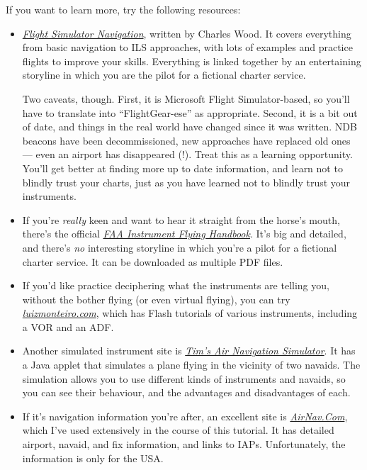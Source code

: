 If you want to learn more, try the following resources:

\begin{itemize}
\item \href{http://www.navfltsm.addr.com}{\textit{Flight Simulator
    Navigation}}, written by Charles Wood.  It covers everything from
  basic navigation to ILS approaches, with lots of examples and
  practice flights to improve your skills.  Everything is linked
  together by an entertaining storyline in which you are the pilot for
  a fictional charter service.

  Two caveats, though.  First, it is Microsoft Flight Simulator-based,
  so you'll have to translate into ``FlightGear-ese'' as appropriate.
  Second, it is a bit out of date, and things in the real world have
  changed since it was written.  NDB beacons have been decommissioned,
  new approaches have replaced old ones --- even an airport has
  disappeared (!).  Treat this as a learning opportunity.  You'll get
  better at finding more up to date information, and learn not to
  blindly trust your charts, just as you have learned not to blindly
  trust your instruments.

\item If you're \emph{really} keen and want to hear it straight from
  the horse's mouth, there's the official
  \href{http://www.faa.gov/library/manuals/aviation/instrument_flying_handbook}{\textit{FAA
      Instrument Flying Handbook}}.  It's big and detailed, and
  there's \emph{no} interesting storyline in which you're a pilot for
  a fictional charter service.  It can be downloaded as multiple PDF
  files.

\item If you'd like practice deciphering what the instruments are
  telling you, without the bother flying (or even virtual flying), you
  can try
  \href{http://www.luizmonteiro.com/Learning.aspx}{\textit{luizmonteiro.com}},
  which has Flash tutorials of various instruments, including a VOR
  and an ADF.

\item Another simulated instrument site is
  \href{http://www.visi.com/~mim/nav/}{\textit{Tim's Air Navigation
      Simulator}}.  It has a Java applet that simulates a plane flying
  in the vicinity of two navaids.  The simulation allows you to use
  different kinds of instruments and navaids, so you can see their
  behaviour, and the advantages and disadvantages of each.

\item If it's navigation information you're after, an excellent site
  is \href{http://www.airnav.com}{\textit{AirNav.Com}}, which I've
  used extensively in the course of this tutorial.  It has detailed
  airport, navaid, and fix information, and links to IAPs.
  Unfortunately, the information is only for the USA.


\end{itemize}
